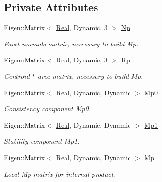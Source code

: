 \subsection*{Private Attributes}
\begin{DoxyCompactItemize}
\item 
Eigen\+::\+Matrix$<$ \hyperlink{namespaceFVCode3D_a40c1f5588a248569d80aa5f867080e83}{Real}, Dynamic, 3 $>$ \hyperlink{classFVCode3D_1_1local__InnerProduct_ab1529332657085ba0189352ec057d75d}{Np}
\begin{DoxyCompactList}\small\item\em Facet normals matrix, necessary to build Mp. \end{DoxyCompactList}\item 
Eigen\+::\+Matrix$<$ \hyperlink{namespaceFVCode3D_a40c1f5588a248569d80aa5f867080e83}{Real}, Dynamic, 3 $>$ \hyperlink{classFVCode3D_1_1local__InnerProduct_a47cd5f267a0825f86a1dcce0958ff10f}{Rp}
\begin{DoxyCompactList}\small\item\em Centroid $\ast$ area matrix, necessary to build Mp. \end{DoxyCompactList}\item 
Eigen\+::\+Matrix$<$ \hyperlink{namespaceFVCode3D_a40c1f5588a248569d80aa5f867080e83}{Real}, Dynamic, Dynamic $>$ \hyperlink{classFVCode3D_1_1local__InnerProduct_a232fd611ad739786558956e561607ba2}{Mp0}
\begin{DoxyCompactList}\small\item\em Consistency component Mp0. \end{DoxyCompactList}\item 
Eigen\+::\+Matrix$<$ \hyperlink{namespaceFVCode3D_a40c1f5588a248569d80aa5f867080e83}{Real}, Dynamic, Dynamic $>$ \hyperlink{classFVCode3D_1_1local__InnerProduct_a6aa515dc796d733d582fc1a3c260bb4c}{Mp1}
\begin{DoxyCompactList}\small\item\em Stability component Mp1. \end{DoxyCompactList}\item 
Eigen\+::\+Matrix$<$ \hyperlink{namespaceFVCode3D_a40c1f5588a248569d80aa5f867080e83}{Real}, Dynamic, Dynamic $>$ \hyperlink{classFVCode3D_1_1local__InnerProduct_a6d4624fe743827c6fa08d7977eafcb28}{Mp}
\begin{DoxyCompactList}\small\item\em Local Mp matrix for internal product. \end{DoxyCompactList}\end{DoxyCompactItemize}

